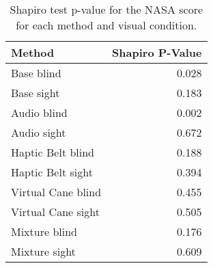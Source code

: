 
\begin{table}[!htb]
\centering
\caption{Shapiro test p-value for the NASA score for each method and visual condition.}
\label{tab:shapiro_nasa_score}
\begin{tabular}{lr}
\toprule
            Method &  Shapiro P-Value \\
\midrule
        Base blind &            0.028 \\
        Base sight &            0.183 \\
       Audio blind &            0.002 \\
       Audio sight &            0.672 \\
 Haptic Belt blind &            0.188 \\
 Haptic Belt sight &            0.394 \\
Virtual Cane blind &            0.455 \\
Virtual Cane sight &            0.505 \\
     Mixture blind &            0.176 \\
     Mixture sight &            0.609 \\
\bottomrule
\end{tabular}
\end{table}

